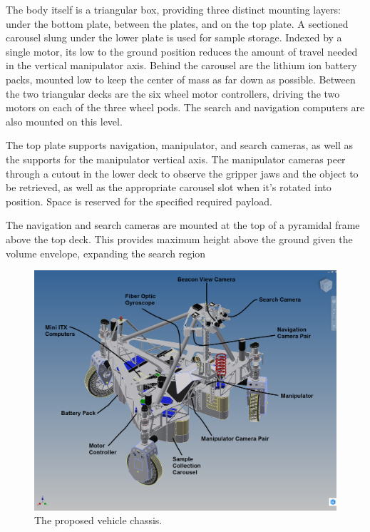 \documentclass[12pt]{article}
\begin{document}
The body itself is a triangular box, providing three distinct mounting layers:
under the bottom plate, between the plates, and on the top plate. A sectioned
carousel slung under the lower plate is used for sample storage. Indexed by a
single motor, its low to the ground position reduces the amount of travel
needed in the vertical manipulator axis. Behind the carousel are the lithium
ion battery packs, mounted low to keep the center of mass as far down as
possible. Between the two triangular decks are the six wheel motor controllers,
driving the two motors on each of the three wheel pods. The search and
navigation computers are also mounted on this level.

The top plate supports navigation, manipulator, and search cameras, as well as
the supports for the manipulator vertical axis. The manipulator cameras peer
through a cutout in the lower deck to observe the gripper jaws and the object
to be retrieved, as well as the appropriate carousel slot when it's rotated
into position. Space is reserved for the specified required payload.

The navigation and search cameras are mounted at the top of a pyramidal frame
above the top deck. This provides maximum height above the ground given the
volume envelope, expanding the search region



\begin{figure}[htbp]
\centering
\includegraphics[width=4.5in]{../assets/srr-with-labels-iso.png}
\caption{The proposed vehicle chassis.}
\label{fig_bot_chassis}
\end{figure}
\end{document}

